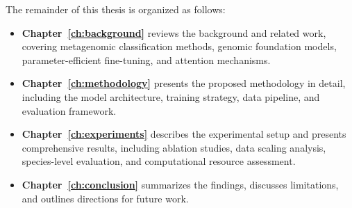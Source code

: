 The remainder of this thesis is organized as follows:

\begin{itemize}
    \item \textbf{Chapter~\ref{ch:background}} reviews the background and related work, covering metagenomic classification methods, genomic foundation models, parameter-efficient fine-tuning, and attention mechanisms.
    
    \item \textbf{Chapter~\ref{ch:methodology}} presents the proposed methodology in detail, including the model architecture, training strategy, data pipeline, and evaluation framework.
    
    \item \textbf{Chapter~\ref{ch:experiments}} describes the experimental setup and presents comprehensive results, including ablation studies, data scaling analysis, species-level evaluation, and computational resource assessment.
    
    \item \textbf{Chapter~\ref{ch:conclusion}} summarizes the findings, discusses limitations, and outlines directions for future work.
\end{itemize}
